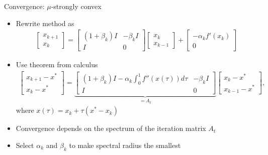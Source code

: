 \documentclass{beamer}
\begin{document}
\begin{frame}{Convergence: $\mu$-strongly convex}
\begin{itemize}
\item Rewrite method as 
\begin{equation*}
\begin{split}
\begin{bmatrix}
x_{k+1}\\
x_k
\end{bmatrix}
 = 
 \begin{bmatrix}
 (1 + \beta_k)I & -\beta_k I\\
 I & 0
 \end{bmatrix}
 \begin{bmatrix}
 x_k\\
 x_{k-1}
 \end{bmatrix}
 +
 \begin{bmatrix}
 -\alpha_k f'(x_k)\\
 0
 \end{bmatrix}
\end{split}
\end{equation*}
\item Use theorem from calculus
\begin{equation*}
\begin{split}
\begin{bmatrix}
x_{k+1} - x^*\\
x_k - x^*
\end{bmatrix}
 = 
 \underbrace{
 \begin{bmatrix}
 (1 + \beta_k)I - \alpha_k \int_0^1 f''(x(\tau))d\tau & -\beta_k I\\
 I & 0
 \end{bmatrix}
 }_{=A_t}
 \begin{bmatrix}
 x_k - x^*\\
 x_{k-1} - x^*
 \end{bmatrix},
\end{split}
\end{equation*}
where $x(\tau) = x_k + \tau(x^* - x_k) $
\item Convergence depends on the spectrum of the iteration matrix $A_t$
\item Select $\alpha_k$ and $\beta_k$ to make spectral radius the smallest 
\end{itemize}
\end{frame}
\end{document}
